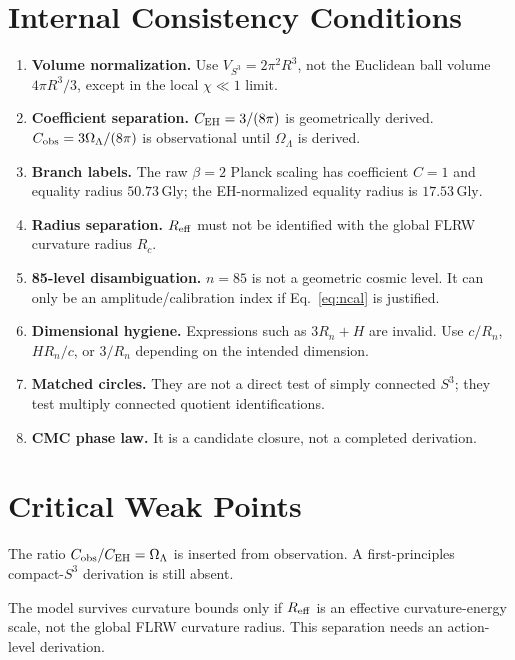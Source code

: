 \documentclass[11pt,a4paper]{article}
\newcommand{\Reff}{R_{\rm eff}}
\newcommand{\OmL}{\Omega_\Lambda}
\newcommand{\CEH}{C_{\rm EH}}
\newcommand{\Cobs}{C_{\rm obs}}
\newcommand{\Gly}{\mathrm{Gly}}
\begin{document}
\section{Internal Consistency Conditions}
\label{sec:corrections}

\begin{enumerate}[leftmargin=1.5em,itemsep=3pt]
\item \textbf{Volume normalization.}  Use $V_{S^3}=2\pi^2R^3$, not the Euclidean
ball volume $4\pi R^3/3$, except in the local $\chi\ll1$ limit.
\item \textbf{Coefficient separation.}  $\CEH=3/(8\pi)$ is geometrically derived.
$\Cobs=3\OmL/(8\pi)$ is observational until $\OmL$ is derived.
\item \textbf{Branch labels.}  The raw $\beta=2$ Planck scaling has coefficient
$C=1$ and equality radius $50.73\,\Gly$; the EH-normalized equality radius is
$17.53\,\Gly$.
\item \textbf{Radius separation.}  $\Reff$ must not be identified with the global
FLRW curvature radius $R_c$.
\item \textbf{85-level disambiguation.}  $n=85$ is not a geometric cosmic level.
It can only be an amplitude/calibration index if Eq.~\eqref{eq:ncal} is justified.
\item \textbf{Dimensional hygiene.}  Expressions such as $3R_n+H$ are invalid.
Use $c/R_n$, $H R_n/c$, or $3/R_n$ depending on the intended dimension.
\item \textbf{Matched circles.}  They are not a direct test of simply connected
$S^3$; they test multiply connected quotient identifications.
\item \textbf{CMC phase law.}  It is a candidate closure, not a completed derivation.
\end{enumerate}

\section{Critical Weak Points}
\label{sec:weak}

\begin{openpbox}[P1: Missing derivation of $\OmL$]
The ratio $\Cobs/\CEH=\OmL$ is inserted from observation.  A first-principles
compact-$S^3$ derivation is still absent.
\end{openpbox}

\begin{openpbox}
The model survives curvature bounds only if $\Reff$ is an effective
curvature-energy scale, not the global FLRW curvature radius.  This separation
needs an action-level derivation.
\end{openpbox}
\end{document}

